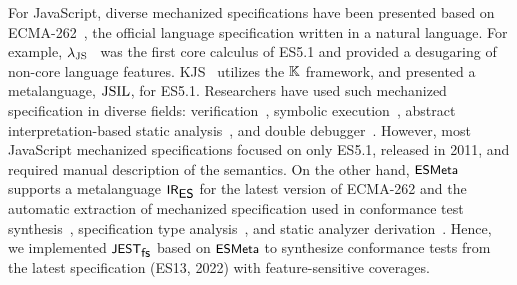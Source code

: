 
For JavaScript, diverse mechanized specifications have
been presented based on ECMA-262~\cite{es13}, the official language
specification written in a natural language.
%
For example, $\lambda_\text{JS}$~\cite{lambdajs} was the first core calculus of ES5.1
and provided a desugaring of non-core language features.
%
KJS~\cite{kjs} utilizes the $\mathbb{K}$ framework, and \citet{javert}
presented a metalanguage, $\text{JSIL}$, for ES5.1.
%
Researchers have used such mechanized specification in diverse fields:
verification~\cite{javert}, symbolic execution~\cite{javert2}, abstract
interpretation-based static analysis~\cite{wala, tajs, jsai, safe, safe2}, and
double debugger~\cite{jsexplain}.
%
However, most JavaScript mechanized specifications focused on only ES5.1,
released in 2011, and required manual description of the semantics.
%
On the other hand, $\textsf{\small ESMeta}$ supports a metalanguage $\textsf{\small IR}_{\textsf{\small ES}}$ for the latest
version of ECMA-262 and the automatic extraction of mechanized specification
used in conformance test synthesis~\cite{jest}, specification type
analysis~\cite{jstar}, and static analyzer derivation~\cite{jsaver}.
%
Hence, we implemented $\textsf{\small JEST}_{\textsf{\small fs}}$ based on $\textsf{\small ESMeta}$ to synthesize conformance tests
from the latest specification (ES13, 2022) with feature-sensitive coverages.


